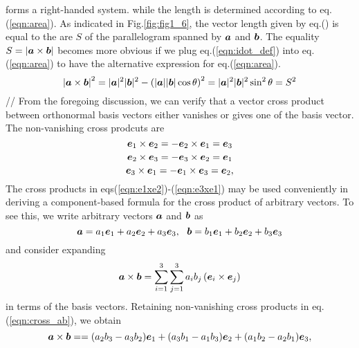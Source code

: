 \documentclass[10pt,a4j]{article}
\begin{document}
forms a right-handed system. while the length is determined according to eq.(\ref{eqn:area}).
As indicated in Fig.\ref{fig:fig1_6}, the vector length given by eq.() is equal to the are $S$ of  
the parallelogram spanned by $\mbox{\boldmath $a$}$ and $\mbox{\boldmath $b$}$. The equality $S=|\mbox{\boldmath $a$}\times \mbox{\boldmath $b$}|$ 
becomes more obvious if we plug eq.(\ref{eqn:idot_def}) into eq.(\ref{eqn:area}) 
to have the alternative expression for eq.(\ref{eqn:area}). 
\begin{equation}
	\left|\mbox{\boldmath $a$}\times \mbox{\boldmath $b$} \right|^2
	=
	|\mbox{\boldmath $a$}|^2|\mbox{\boldmath $b$}|^2-
	\left(
	|\mbox{\boldmath $a$}||\mbox{\boldmath $b$}|\cos\theta \right)^2
	= |\mbox{\boldmath $a$}|^2|\mbox{\boldmath $b$}|^2\sin^2\theta
	=S^2
	\label{eqn:}
\end{equation}
//
From the foregoing discussion, we can verify that a vector cross product between 
orthonormal basis vectors either vanishes or gives one of the basis vector. 
The non-vanishing cross prodcuts are
\begin{equation}
	\mbox{\boldmath $e$}_1 \times  \mbox{\boldmath $e$}_2=
	-\mbox{\boldmath $e$}_2 \times  \mbox{\boldmath $e$}_1=
	\mbox{\boldmath $e$}_3
	\label{eqn:e1xe2}
\end{equation}
\begin{equation}
	\mbox{\boldmath $e$}_2 \times  \mbox{\boldmath $e$}_3= 
	-\mbox{\boldmath $e$}_3 \times  \mbox{\boldmath $e$}_2=\mbox{\boldmath $e$}_1
	\label{eqn:e2xe3}
\end{equation}
\begin{equation}
	\mbox{\boldmath $e$}_3 \times  \mbox{\boldmath $e$}_1
	=
	-\mbox{\boldmath $e$}_1 \times  \mbox{\boldmath $e$}_3=\mbox{\boldmath $e$}_2,
	\label{eqn:e3xe1}
\end{equation}
The cross products in eqs(\ref{eqn:e1xe2})-(\ref{eqn:e3xe1}) may be used conveniently 
 in deriving a component-based formula for the cross product of arbitrary vectors.
 To see this, we write arbitrary vectors $\mbox{\boldmath $a$}$ and $\mbox{\boldmath $b$}$ as
\begin{equation}
	\fat{a}=
	a_1\fat{e}_1 + a_2\fat{e}_2 + a_3\fat{e}_3, \ \ 
	\fat{b}=
	b_1\fat{e}_1 + b_2\fat{e}_2 + b_3\fat{e}_3
	\label{eqn:}
\end{equation}
and consider expanding 
\begin{equation}
	\mbox{\boldmath $a$}\times \mbox{\boldmath $b$} = 
	\sum_{i=1}^3
	\sum_{j=1}^3
	a_ib_j \left(\mbox{\boldmath $e$}_i\times \mbox{\boldmath $e$}_j\right) 
	\label{eqn:cross_ab}
\end{equation}
in terms of the basis vectors. Retaining non-vanishing cross products in 
eq.(\ref{eqn:cross_ab}), we obtain
\begin{equation}
	\mbox{\boldmath $a$}\times \mbox{\boldmath $b$} = 
	=
	(a_2b_3-a_3b_2)\mbox{\boldmath $e$}_1
	+
	(a_3b_1-a_1b_3)\mbox{\boldmath $e$}_2
	+
	(a_1b_2-a_2b_1)\mbox{\boldmath $e$}_3,
	\label{eqn:cross_ab_worked}
\end{equation}
\end{document}
